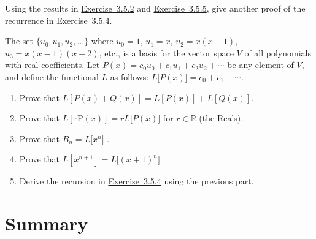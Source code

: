 \documentclass[10pt,]{book}
\theoremstyle{plain}
\theoremstyle{definition}
\theoremstyle{definition}
\theoremstyle{definition}
\theoremstyle{definition}
\numberwithin{equation}{chapter}
\def\R{\mathbb R}
\begin{document}
\begin{divisionexercise}{6}\hypertarget{exercise-120}{}
\hypertarget{p-1257}{}%
Using the results in \hyperlink{ex-bell-as-stirlings}{Exercise~3.5.2} and \hyperlink{ex-stirling-recurrence}{Exercise~3.5.5}, give another proof of the recurrence in \hyperlink{ex-bell-recurrence}{Exercise~3.5.4}.%
\end{divisionexercise}%
\begin{divisionexercise}{7}\hypertarget{exercise-121}{}
\hypertarget{p-1258}{}%
The set \(\{u_{0}, u_{1}, u_{2}, \ldots \}\) where \(u_{0} = 1\), \(u_{1} = x\), \(u_{2} = x(x - 1)\), \(u_{3} = x(x - 1)(x - 2)\), etc., is a basis for the vector space \(V\) of all polynomials with real coefficients. Let \(P(x) = c_{0}u_{0} + c_{1}u_{1} + c_{2}u_{2} + \cdots\) be any element of \(V\), and define the functional \(L\) as follows: \(L\lbrack P(x)\rbrack = c_{0} + c_{1} + \cdots\).%
\par
\hypertarget{p-1259}{}%
\leavevmode%
\begin{enumerate}[label=(\alph*)]
\item\hypertarget{li-230}{}\hypertarget{p-1260}{}%
Prove that \(L\left\lbrack P\left( x \right) + Q\left( x \right) \right\rbrack = L\left\lbrack P\left( x \right) \right\rbrack + L\left\lbrack Q\left( x \right) \right\rbrack.\)%
\item\hypertarget{li-231}{}\hypertarget{p-1261}{}%
Prove that \(L\left\lbrack \text{rP}\left( x \right) \right\rbrack = rL\lbrack P\left( x \right)\rbrack\) for \(r \in \R\) (the Reals).%
\item\hypertarget{li-232}{}\hypertarget{p-1262}{}%
Prove that \(B_{n} = L\lbrack x^{n}\rbrack\) .%
\item\hypertarget{li-233}{}\hypertarget{p-1263}{}%
Prove that \(L\left\lbrack x^{n + 1} \right\rbrack = L\lbrack\left( x + 1 \right)^{n}\rbrack\) .%
\item\hypertarget{li-234}{}\hypertarget{p-1264}{}%
Derive the recursion in \hyperlink{ex-bell-recurrence}{Exercise~3.5.4} using the previous part.%
\end{enumerate}
%
\end{divisionexercise}%
\typeout{************************************************}
\typeout{************************************************}
\section[{Summary}]{Summary}\label{sec_adv-conc}
%
%
%
\appendix
%
\typeout{************************************************}
\typeout{************************************************}
\end{document}
